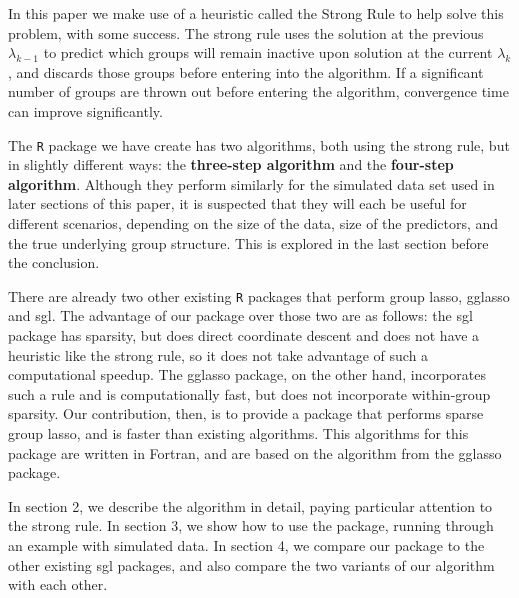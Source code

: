 \documentclass[titlepage]{article}
\newcommand{\pkg}[1]{{\normalfont\fontseries{b}\selectfont #1}}
\begin{document}
In this paper we make use of a heuristic called the Strong Rule \citep{tibshirani2012strong} to help solve this problem, with some success. The strong rule uses the solution at the previous $\lambda_{k-1}$ to predict which groups will remain inactive upon solution at the current $\lambda_k$, and discards those groups before entering into the algorithm. If a significant number of groups are thrown out before entering the algorithm, convergence time can improve significantly.

The \texttt{R} package we have create has two algorithms, both using the strong rule, but in slightly different ways: the \textbf{three-step algorithm} and the \textbf{four-step algorithm}. Although they perform similarly for the simulated data set used in later sections of this paper, it is suspected that they will each be useful for different scenarios, depending on the size of the data, size of the predictors, and the true underlying group structure. This is explored in the last section before the conclusion.


There are already two other existing \texttt{R} packages that perform group lasso, \pkg{gglasso} and \pkg{sgl}. The advantage of our package over those two are as follows: the sgl package has sparsity, but does direct coordinate descent and does not have a heuristic like the strong rule, so it does not take advantage of such a computational speedup. The gglasso package, on the other hand, incorporates such a rule and is computationally fast, but does not incorporate within-group sparsity. Our contribution, then, is to provide a package that performs sparse group lasso, and is faster than existing algorithms. This algorithms for this package are written in Fortran, and are based on the algorithm from the gglasso package.

In section 2, we describe the algorithm in detail, paying particular attention to the strong rule. In section 3, we show how to use the package, running through an example with simulated data. In section 4, we compare our package to the other existing sgl packages, and also compare the two variants of our algorithm with each other.
\end{document}
